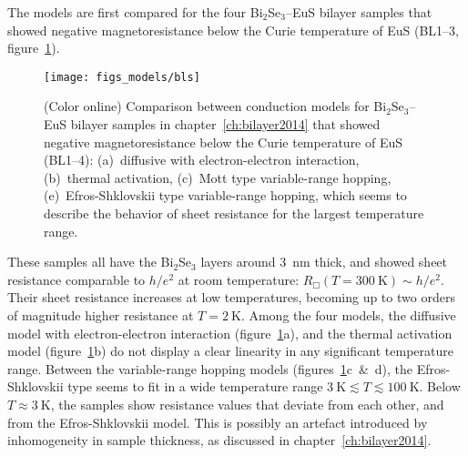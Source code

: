 The models are first compared for the four Bi$_2$Se$_3$--EuS bilayer samples that showed negative magnetoresistance below the Curie temperature of EuS (BL1--3, figure~\ref{fig:models_bls}).%
\begin{figure}[ht]%
    \centering%
    \texttt{[image: figs\_models/bls]}%
    \caption[Conduction model comparison: Bi$_2$Se$_3$--EuS bilayers: BL1--BL4]{\label{fig:models_bls}(Color online) Comparison between conduction models for Bi$_2$Se$_3$--EuS bilayer samples in chapter~\ref{ch:bilayer2014} that showed negative magnetoresistance below the Curie temperature of EuS (BL1--4): (a)~diffusive with electron-electron interaction, (b)~thermal activation, (c)~Mott type variable-range hopping, (e)~Efros-Shklovskii type variable-range hopping, which seems to describe the behavior of sheet resistance for the largest temperature range.}%
\end{figure} %
%
These samples all have the Bi$_2$Se$_3$ layers around \SI{3}{nm} thick, and showed sheet resistance comparable to $h/e^2$ at room temperature: $R_\Box(T=300~\mathrm{K}) \sim h/e^2$. Their sheet resistance increases at low temperatures, becoming up to two orders of magnitude higher resistance at $T = 2~\mathrm{K}$. Among the four models, the diffusive model with electron-electron interaction (figure~\ref{fig:models_bls}a), and the thermal activation model (figure~\ref{fig:models_bls}b) do not display a clear linearity in any significant temperature range. Between the variable-range hopping models (figures~\ref{fig:models_bls}c~\&~d), the Efros-Shklovskii type seems to fit in a wide temperature range $3~\mathrm{K} \lesssim T \lesssim 100~\mathrm{K}$. Below $T \approx 3~\mathrm{K}$, the samples show resistance values that deviate from each other, and from the Efros-Shklovskii model. This is possibly an artefact introduced by inhomogeneity in sample thickness, as discussed in chapter~\ref{ch:bilayer2014}.

